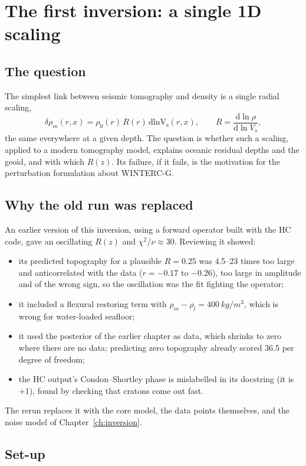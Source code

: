 \chapter{The first inversion: a single 1D scaling}
\label{ch:single}

\section{The question}

The simplest link between seismic tomography and density is a single radial scaling,
\[
    \delta\rho_m(r,x) = \rho_0(r)\,R(r)\,\mathrm{dlnV_s}(r,x),
    \qquad R = \frac{\mathrm d\ln\rho}{\mathrm d\ln V_s},
\]
the same everywhere at a given depth.
The question is whether such a scaling, applied to a modern tomography model, explains oceanic residual depths and the geoid, and with which $R(z)$.
Its failure, if it fails, is the motivation for the perturbation formulation about WINTERC-G.

\section{Why the old run was replaced}

An earlier version of this inversion, using a forward operator built with the HC code, gave an oscillating $R(z)$ and $\chi^2/\nu\approx30$.
Reviewing it showed:
\begin{itemize}[nosep]
\item its predicted topography for a plausible $R=0.25$ was 4.5--23 times too large and anticorrelated with the data ($r=-0.17$ to $-0.26$), too large in amplitude and of the wrong sign, so the oscillation was the fit fighting the operator;
\item it included a flexural restoring term with $\rho_m-\rho_l = \qty{400}{kg/m^3}$, which is wrong for water-loaded seafloor;
\item it used the posterior of the earlier chapter as data, which shrinks to zero where there are no data; predicting zero topography already scored 36.5 per degree of freedom;
\item the HC output's Condon--Shortley phase is mislabelled in its docstring (it is $+1$), found by checking that cratons come out fast.
\end{itemize}
The rerun replaces it with the core model, the data points themselves, and the noise model of Chapter~\ref{ch:inversion}.

\section{Set-up}

